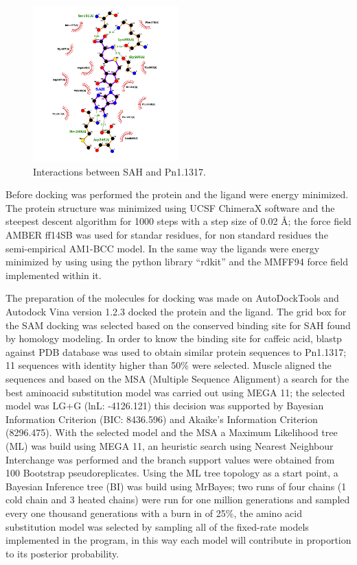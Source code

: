 \documentclass[12pt]{article}
\begin{document}
	\FloatBarrier
	\begin{figure}
		\centering
		\includegraphics[width=0.5\textwidth]{../4/Swiss/sah.png}
		\caption{Interactions between SAH and Pn1.1317.}
		\label{fig4_3}
	\end{figure}
	\FloatBarrier
	
	Before docking was performed the protein and the ligand were energy minimized. The protein structure was minimized using UCSF ChimeraX software \cite{chimera,chimera_2} and the steepest descent algorithm for 1000 steps with a step size of 0.02 \r{A}; the force field AMBER ff14SB was used for standar residues, for non standard residues the semi-empirical AM1-BCC model. \cite{am1_bcc,am1_bcc_2,am1_bcc_3} In the same way the ligands were energy minimized by using using the python library ``rdkit'' and the MMFF94 force field implemented within it. \cite{rdkit,rdkit_mmff}
	
	The preparation of the molecules for docking was made on AutoDockTools and Autodock Vina version 1.2.3 docked the protein and the ligand. \cite{adt,vina,vina_2} The grid box for the SAM docking was selected based on the conserved binding site for SAH found by homology modeling. In order to know the binding site for caffeic acid, blastp against PDB database was used to obtain similar protein sequences to Pn1.1317; 11 sequences with identity higher than 50\% were selected. \cite{blastp,blastp_2} Muscle aligned the sequences and based on the MSA (Multiple Sequence Alignment) a search for the best aminoacid substitution model was carried out using MEGA 11; the selected model was LG+G (lnL: -4126.121) this decision was supported by Bayesian Information Criterion (BIC: 8436.596) and Akaike's Information Criterion (8296.475). \cite{muscle,mega11} With the selected model and the MSA a Maximum Likelihood tree (ML) was build using MEGA 11, an heuristic search using Nearest Neighbour Interchange was performed and the branch support values were obtained from 100 Bootstrap pseudoreplicates. \cite{mega11} Using the ML tree topology as a start point, a Bayesian Inference tree (BI) was build using MrBayes; two runs of four chains (1 cold chain and 3 heated chains) were run for one million generations and sampled every one thousand generations with a burn in of 25\%, the amino acid substitution model was selected by sampling all of the fixed-rate models implemented in the program, in this way each model will contribute in proportion to its posterior probability. \cite{mrbayes}
	
\end{document}
